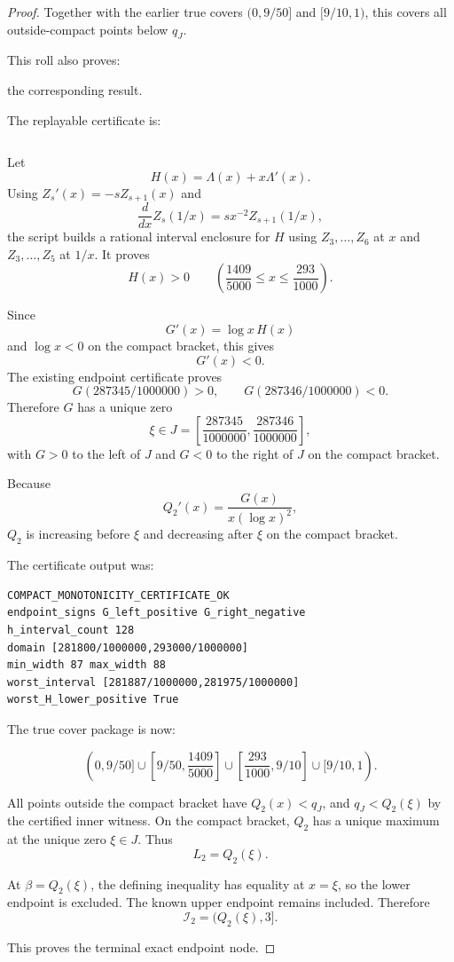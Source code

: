 \begin{proof}
Together with the earlier true covers \((0,9/50]\) and \([9/10,1)\), this covers all outside-compact points below \(q_J\).

This roll also proves:

the corresponding result.

The replayable certificate is:

\begin{verbatim}
\end{verbatim}

Let
\[
H(x)=\Lambda(x)+x\Lambda'(x).
\]
Using \(Z_s'(x)=-sZ_{s+1}(x)\) and
\[
\frac{d}{dx}Z_s(1/x)=s x^{-2} Z_{s+1}(1/x),
\]
the script builds a rational interval enclosure for \(H\) using \(Z_3,\ldots,Z_6\) at \(x\) and \(Z_3,\ldots,Z_5\) at \(1/x\). It proves
\[
H(x)>0
\qquad
\left(\frac{1409}{5000}\le x\le\frac{293}{1000}\right).
\]

Since
\[
G'(x)=\log x\,H(x)
\]
and \(\log x<0\) on the compact bracket, this gives
\[
G'(x)<0.
\]
The existing endpoint certificate proves
\[
G(287345/1000000)>0,
\qquad
G(287346/1000000)<0.
\]
Therefore \(G\) has a unique zero
\[
\xi\in J=\left[\frac{287345}{1000000},\frac{287346}{1000000}\right],
\]
with \(G>0\) to the left of \(J\) and \(G<0\) to the right of \(J\) on the compact bracket.

Because
\[
Q_2'(x)=\frac{G(x)}{x(\log x)^2},
\]
\(Q_2\) is increasing before \(\xi\) and decreasing after \(\xi\) on the compact bracket.

The certificate output was:

\begin{verbatim}
COMPACT_MONOTONICITY_CERTIFICATE_OK
endpoint_signs G_left_positive G_right_negative
h_interval_count 128
domain [281800/1000000,293000/1000000]
min_width 87 max_width 88
worst_interval [281887/1000000,281975/1000000]
worst_H_lower_positive True
\end{verbatim}

The true cover package is now:

\[
(0,9/50]\cup
\left[9/50,\frac{1409}{5000}\right]\cup
\left[\frac{293}{1000},9/10\right]\cup
[9/10,1).
\]

All points outside the compact bracket have \(Q_2(x)<q_J\), and \(q_J<Q_2(\xi)\) by the certified inner witness. On the compact bracket, \(Q_2\) has a unique maximum at the unique zero \(\xi\in J\). Thus
\[
L_2=Q_2(\xi).
\]

At \(\beta=Q_2(\xi)\), the defining inequality has equality at \(x=\xi\), so the lower endpoint is excluded. The known upper endpoint remains included. Therefore
\[
\mathcal I_2=(Q_2(\xi),3].
\]

This proves the terminal exact endpoint node.
\end{proof}

